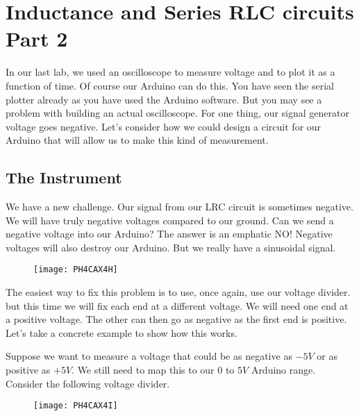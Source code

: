 \chapter{Inductance and Series RLC circuits Part 2}
In our last lab, we used an oscilloscope to measure voltage and to plot it
as a function of time. Of course our Arduino can do this. You have seen the
serial plotter already as you have used the Arduino software. But you may
see a problem with building an actual oscilloscope. For one thing, our
signal generator voltage goes negative. Let's consider how we could design a
circuit for our Arduino that will allow us to make this kind of measurement.

\section{The Instrument}

We have a new challenge. Our signal from our LRC circuit is sometimes
negative. We will have truly negative voltages compared to our ground. Can
we send a negative voltage into our Arduino? The answer is an emphatic NO!
Negative voltages will also destroy our Arduino. But we really have a
sinusoidal signal. \begin{figure}[h!]
\texttt{[image: PH4CAX4H]}
\end{figure}

The easiest way to fix this problem is to use, once again, use our voltage
divider. but this time we will fix each end at a different voltage. We will
need one end at a positive voltage. The other can then go as negative as the
first end is positive. Let's take a concrete example to show how this works.

Suppose we want to measure a voltage that could be as negative as $-5\unit{V}
$ or as positive as $+5\unit{V}.$ We still need to map this to our $0$ to $5%
\unit{V}$ Arduino range. Consider the following voltage divider.\begin{figure}[h!]
\texttt{[image: PH4CAX4I]}
\end{figure}

